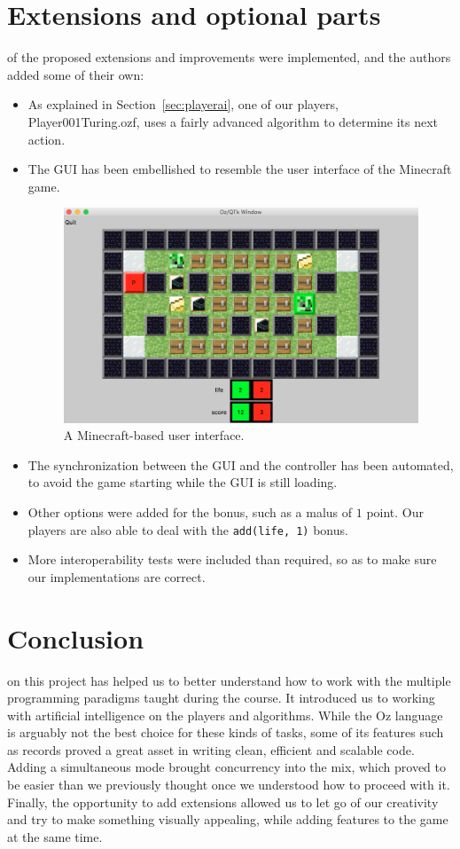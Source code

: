 \documentclass[12pt,journal]{IEEEtran}
\newcommand{\ntt}{\normalfont\ttfamily}
\newcommand{\fn}[1]{{\protect\ntt#1}}
\begin{document}
\section{Extensions and optional parts}
\label{sec:extensions}
 of the proposed extensions and improvements were implemented, and the authors added some of their own:
\begin{itemize}
	\item As explained in Section~\ref{sec:playerai}, one of our players,
	\fn{Player001Turing.ozf}, uses a fairly advanced algorithm to determine its next action.
	\item The GUI has been embellished to resemble the user interface of the Minecraft game.
	\begin{figure}[!hbtp]
		\centering
		\includegraphics[width=\columnwidth]{gui.png}
		\caption{A Minecraft-based user interface.}
		\label{fig:gui}
	\end{figure}
	\item The synchronization between the GUI and the controller has been automated, to avoid the game starting while the GUI is still loading.
	\item Other options were added for the bonus, such as a malus of \(1\) point.
	Our players are also able to deal with the \lstinline|add(life, 1)| bonus.
	\item More interoperability tests were included than required, so as to make sure our implementations are correct.
\end{itemize}

\section{Conclusion}
 on this project has helped us to better understand how to work with the multiple programming paradigms taught during the course.
It introduced us to working with artificial intelligence on the players and algorithms.
While the Oz language is arguably not the best choice for these kinds of tasks, some of its features such as records proved a great asset in writing clean, efficient and scalable code.
Adding a simultaneous mode brought concurrency into the mix, which proved to be easier than we previously thought once we understood how to proceed with it.
Finally, the opportunity to add extensions allowed us to let go of our creativity and try to make something visually appealing, while adding features to the game at the same time.
\end{document}

